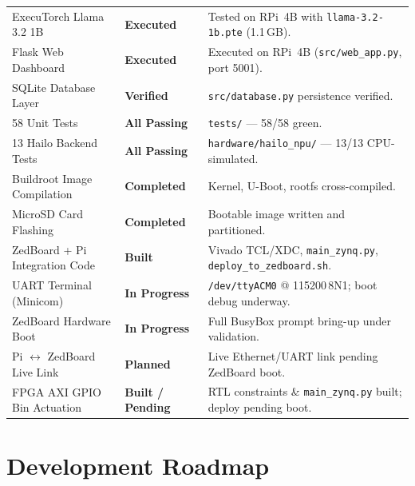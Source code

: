\documentclass[12pt,a4paper]{article}
\begin{document}
\begin{table}[H]
\begin{tabularx}{\linewidth}{@{} L{5.4cm} C{2.7cm} X @{}}
ExecuTorch Llama 3.2 1B           & \textcolor{ecosortgreen}{\textbf{Executed}} & Tested on RPi~4B with \texttt{llama-3.2-1b.pte} (1.1\,GB). \\
Flask Web Dashboard               & \textcolor{ecosortgreen}{\textbf{Executed}} & Executed on RPi~4B (\texttt{src/web\_app.py}, port 5001). \\
SQLite Database Layer             & \textcolor{ecosortgreen}{\textbf{Verified}} & \texttt{src/database.py} persistence verified. \\
58 Unit Tests                     & \textcolor{ecosortgreen}{\textbf{All Passing}} & \texttt{tests/} --- 58/58 green. \\
13 Hailo Backend Tests            & \textcolor{ecosortgreen}{\textbf{All Passing}} & \texttt{hardware/hailo\_npu/} --- 13/13 CPU-simulated. \\
Buildroot Image Compilation       & \textcolor{ecosortgreen}{\textbf{Completed}} & Kernel, U-Boot, rootfs cross-compiled. \\
MicroSD Card Flashing             & \textcolor{ecosortgreen}{\textbf{Completed}} & Bootable image written and partitioned. \\
ZedBoard + Pi Integration Code    & \textcolor{ecosortgreen}{\textbf{Built}} & Vivado TCL/XDC, \texttt{main\_zynq.py}, \texttt{deploy\_to\_zedboard.sh}. \\
UART Terminal (Minicom)           & \textcolor{warnyellow}{\textbf{In Progress}} & \texttt{/dev/ttyACM0} @ 115200\,8N1; boot debug underway. \\
ZedBoard Hardware Boot            & \textcolor{warnyellow}{\textbf{In Progress}} & Full BusyBox prompt bring-up under validation. \\
Pi $\leftrightarrow$ ZedBoard Live Link & \textcolor{warnyellow}{\textbf{Planned}} & Live Ethernet/UART link pending ZedBoard boot. \\
FPGA AXI GPIO Bin Actuation       & \textcolor{warnyellow}{\textbf{Built / Pending}} & RTL constraints \& \texttt{main\_zynq.py} built; deploy pending boot. \\
\bottomrule
\end{tabularx}
\end{table}

\clearpage

\section{Development Roadmap}
\end{document}
